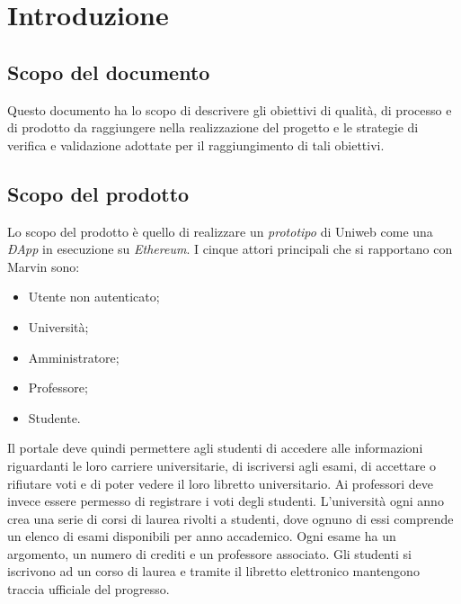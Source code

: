 \section{Introduzione}
\subsection{Scopo del documento}
Questo documento ha lo scopo di descrivere gli obiettivi di qualità, di processo e di prodotto da raggiungere nella realizzazione del progetto e le strategie di verifica e validazione adottate per il raggiungimento di tali obiettivi.
\subsection{Scopo del prodotto}
\begin{comment}
L'obiettivo di Marvin è di realizzare un \textit{prototipo}\ped{G} di Uniweb come \textit{ÐApp}\ped{G} che giri su \textit{Ethereum}\ped{G}. Gli attori principali che si rapportano con Marvin sono:
\begin{enumerate}
	\item Università;
	\item Professori;
	\item Studenti.
\end{enumerate}
Il portale deve quindi permettere agli studenti di accedere alle informazioni riguardanti le loro carriere universitarie, di iscriversi agli esami, di accettare o rifiutare voti e di poter vedere il loro libretto universitario.
Ai professori deve invece essere permesso registrare i voti degli studenti.
L'università ogni anno crea una serie di corsi di laurea rivolti a studenti, dove ognuno di essi comprende un elenco di esami disponibili per anno accademico. Ogni esame ha un argomento, un numero di crediti e un professore associato. Gli studenti si iscrivono ad un corso di laurea e tramite il libretto elettronico mantengono traccia ufficiale del progresso.
\end{comment}
Lo scopo del prodotto è quello di realizzare un \emph{prototipo} di Uniweb come una \emph{ÐApp} in esecuzione su \emph{Ethereum}. I cinque attori principali che si rapportano con Marvin sono:
\begin{itemize}
	\item Utente non autenticato; 
	\item Università;
	\item Amministratore;
	\item Professore;
	\item Studente.
\end{itemize} 
Il portale deve quindi permettere agli studenti di accedere alle informazioni riguardanti le loro carriere universitarie, di iscriversi agli esami, di accettare o rifiutare voti e di poter vedere il loro libretto universitario.
Ai professori deve invece essere permesso di registrare i voti degli studenti.
L'università ogni anno crea una serie di corsi di laurea rivolti a studenti, dove ognuno di essi comprende un elenco di esami disponibili per anno accademico. Ogni esame ha un argomento, un numero di crediti e un professore associato. Gli studenti si iscrivono ad un corso di laurea e tramite il libretto elettronico mantengono traccia ufficiale del progresso.
